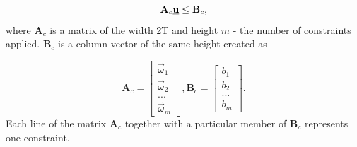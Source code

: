 \documentclass[a4paper,11pt,titlepage]{article}
\newcommand{\uvec}{\textbf{\underline{u}}}
\begin{document}
\begin{equation}
\label{eq:MPC_cond}
\textbf{A}_c \uvec \leq \textbf{B}_c,
\end{equation}
where $\textbf{A}_c$ is a matrix of the width 2T and height $m$ - the number of constraints applied. $\textbf{B}_c$ is a column vector of the same height created as

\begin{equation}
\textbf{A}_c =
  \begin{bmatrix}
  \vec{\omega}_1 \\
  \vec{\omega}_2 \\
  ...	   \\
  \vec{\omega}_m
  \end{bmatrix},\textbf{B}_c = \begin{bmatrix}
  b_1 \\
  b_2 \\
  ... \\
  b_m
  \end{bmatrix}.
\end{equation}
Each line of the matrix $\textbf{A}_c$ together with a particular member of $\textbf{B}_c$ represents one constraint. 
\end{document}
